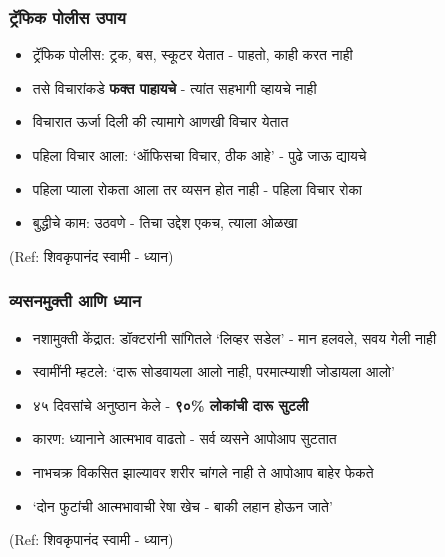\begin{frame}[fragile]\frametitle{ट्रॅफिक पोलीस उपाय}

	\begin{itemize}
	\item ट्रॅफिक पोलीस: ट्रक, बस, स्कूटर येतात - पाहतो, काही करत नाही
	\item तसे विचारांकडे \textbf{फक्त पाहायचे} - त्यांत सहभागी व्हायचे नाही
	\item विचारात ऊर्जा दिली की त्यामागे आणखी विचार येतात
	\item पहिला विचार आला: `ऑफिसचा विचार, ठीक आहे' - पुढे जाऊ द्यायचे
	\item पहिला प्याला रोकता आला तर व्यसन होत नाही - पहिला विचार रोका
	\item बुद्धीचे काम: उठवणे - तिचा उद्देश एकच, त्याला ओळखा
	\end{itemize}

{\tiny (Ref: शिवकृपानंद स्वामी - ध्यान)}

\end{frame}

\begin{frame}[fragile]\frametitle{व्यसनमुक्ती आणि ध्यान}

	\begin{itemize}
	\item नशामुक्ती केंद्रात: डॉक्टरांनी सांगितले `लिव्हर सडेल' - मान हलवले, सवय गेली नाही
	\item स्वामींनी म्हटले: `दारू सोडवायला आलो नाही, परमात्म्याशी जोडायला आलो'
	\item ४५ दिवसांचे अनुष्ठान केले - \textbf{९०\% लोकांची दारू सुटली}
	\item कारण: ध्यानाने आत्मभाव वाढतो - सर्व व्यसने आपोआप सुटतात
	\item नाभचक्र विकसित झाल्यावर शरीर चांगले नाही ते आपोआप बाहेर फेकते
	\item `दोन फुटांची आत्मभावाची रेषा खेच - बाकी लहान होऊन जाते'
	\end{itemize}

{\tiny (Ref: शिवकृपानंद स्वामी - ध्यान)}

\end{frame}

